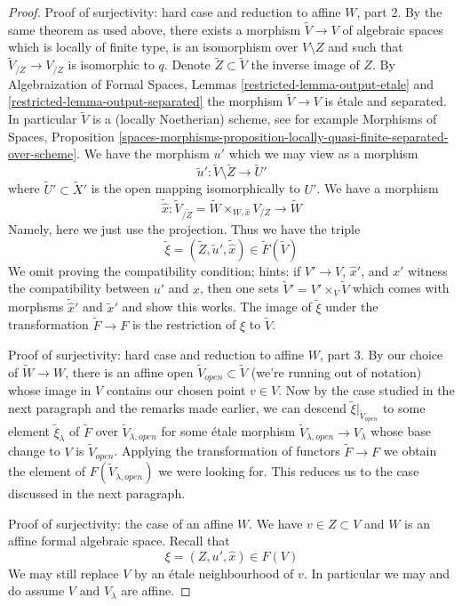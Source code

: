 \documentclass{stacks-project}
\theoremstyle{plain}
\theoremstyle{definition}
\theoremstyle{remark}
\numberwithin{equation}{subsection}
\begin{document}
\begin{proof}
\medskip\noindent
Proof of surjectivity: hard case and reduction to affine $W$, part 2.
By the same theorem as used above, there exists a morphism
$\tilde V \to V$ of algebraic spaces which is locally of finite type,
is an isomorphism over $V \setminus Z$ and such that
$\tilde V_{/Z} \to V_{/Z}$ is isomorphic to $q$.
Denote $\tilde Z \subset \tilde V$ the inverse image of $Z$.
By Algebraization of Formal Spaces, Lemmas
\ref{restricted-lemma-output-etale} and \ref{restricted-lemma-output-separated}
the morphism $\tilde V \to V$ is \'etale and separated.
In particular $\tilde V$ is a (locally Noetherian) scheme, see for example
Morphisms of Spaces, Proposition
\ref{spaces-morphisms-proposition-locally-quasi-finite-separated-over-scheme}.
We have the morphism $u'$ which we may view as a morphism
$$
\tilde u' : \tilde V \setminus \tilde Z \longrightarrow \tilde U'
$$
where $\tilde U' \subset \tilde X'$ is the open mapping isomorphically
to $U'$. We have a morphism
$$
\tilde {\hat x} :
\tilde V_{/\tilde Z} = \tilde W \times_{W, \hat x} V_{/Z}
\longrightarrow
\tilde W
$$
Namely, here we just use the projection. Thus we have the triple
$$
\tilde \xi = (\tilde Z, \tilde u', \tilde {\hat x}) \in \tilde F(\tilde V)
$$
We omit proving the compatibility condition; hints: if $V' \to V$, $\hat x'$,
and $x'$ witness the compatibility between $u'$ and $\hat x$, then one
sets $\tilde V' = V' \times_V \tilde V$ which comes with morphsms
$\tilde{\hat x}'$ and $\tilde x'$ and show this works.
The image of $\tilde \xi$ under the transformation $\tilde F \to F$
is the restriction of $\xi$ to $\tilde V$.

\medskip\noindent
Proof of surjectivity: hard case and reduction to affine $W$, part 3.
By our choice of $\tilde W \to W$, there is an affine open
$\tilde V_{open} \subset \tilde V$ (we're running out of notation)
whose image in $V$ contains our chosen point $v \in V$.
Now by the case studied in the next paragraph and the remarks made
earlier, we can descend $\tilde \xi|_{\tilde V_{open}}$
to some element $\tilde \xi_\lambda$ of $\tilde F$ over
$\tilde V_{\lambda, open}$
for some \'etale morphism $\tilde V_{\lambda, open} \to V_\lambda$
whose base change to $V$ is $\tilde V_{open}$.
Applying the transformation of functors $\tilde F \to F$
we obtain the element of $F(\tilde V_{\lambda, open})$
we were looking for. This reduces us to the case discussed
in the next paragraph.

\medskip\noindent
Proof of surjectivity: the case of an affine $W$. We have $v \in Z \subset V$
and $W$ is an affine formal algebraic space. Recall that
$$
\xi = (Z, u', \hat x) \in F(V)
$$
We may still replace $V$ by an \'etale neighbourhood of $v$.
In particular we may and do assume $V$ and $V_\lambda$ are affine.


\end{proof}
\end{document}
